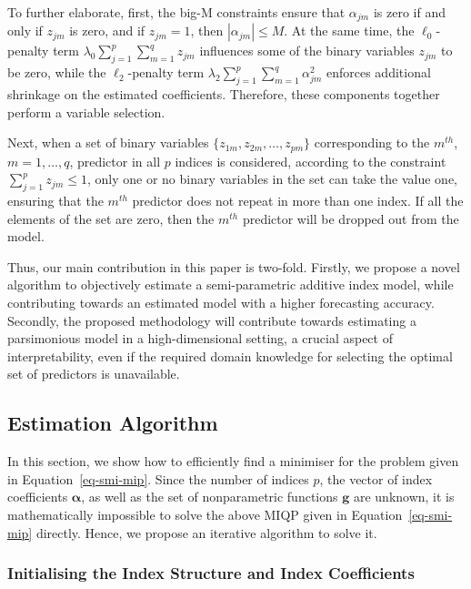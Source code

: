 \documentclass[11pt,a4paper,]{article}
\begin{document}
To further elaborate, first, the big-M constraints ensure that
\(\alpha_{jm}\) is zero if and only if \(z_{jm}\) is zero, and if
\(z_{jm} = 1\), then \(\left |\alpha_{jm}\right | \le M\). At the same
time, the \(\ell_{0}\)-penalty term
\(\lambda_{0}\sum_{j = 1}^{p}\sum_{m = 1}^{q}z_{jm}\) influences some of
the binary variables \(z_{jm}\) to be zero, while the
\(\ell_{2}\)-penalty term
\(\lambda_{2}\sum_{j = 1}^{p}\sum_{m = 1}^{q}\alpha_{jm}^{2}\) enforces
additional shrinkage on the estimated coefficients. Therefore, these
components together perform a variable selection.

Next, when a set of binary variables
\(\{z_{1m}, z_{2m}, \dots, z_{pm}\}\) corresponding to the \(m^{th}\),
\(m = 1, \dots, q\), predictor in all \(p\) indices is considered,
according to the constraint \(\sum_{j = 1}^{p}z_{jm} \le 1\), only one
or no binary variables in the set can take the value one, ensuring that
the \(m^{th}\) predictor does not repeat in more than one index. If all
the elements of the set are zero, then the \(m^{th}\) predictor will be
dropped out from the model.

Thus, our main contribution in this paper is two-fold. Firstly, we
propose a novel algorithm to objectively estimate a semi-parametric
additive index model, while contributing towards an estimated model with
a higher forecasting accuracy. Secondly, the proposed methodology will
contribute towards estimating a parsimonious model in a high-dimensional
setting, a crucial aspect of interpretability, even if the required
domain knowledge for selecting the optimal set of predictors is
unavailable.

\hypertarget{estimation-algorithm}{%
\subsection{Estimation Algorithm}\label{estimation-algorithm}}

In this section, we show how to efficiently find a minimiser for the
problem given in Equation~\ref{eq-smi-mip}. Since the number of indices
\(p\), the vector of index coefficients \(\bm{\alpha}\), as well as the
set of nonparametric functions \(\bm{g}\) are unknown, it is
mathematically impossible to solve the above MIQP given in
Equation~\ref{eq-smi-mip} directly. Hence, we propose an iterative
algorithm to solve it.

\hypertarget{sec-step1}{%
\subsubsection{Initialising the Index Structure and Index
Coefficients}\label{sec-step1}}
\end{document}
